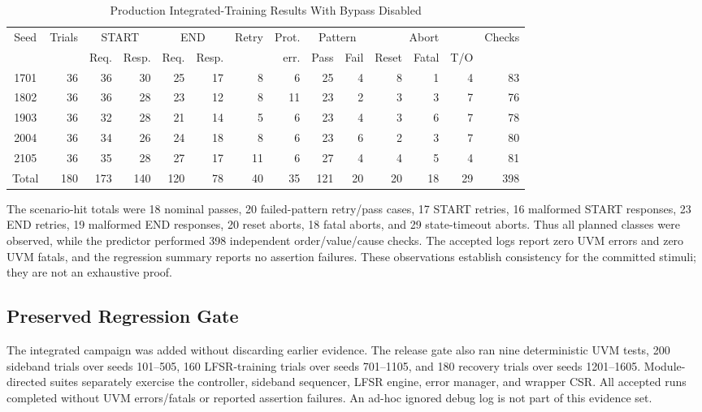 \begin{table}[t]
\caption{Production Integrated-Training Results With Bypass Disabled}
\label{tab:integrated}
\centering
\small
\setlength{\tabcolsep}{4.2pt}
\begin{tabular}{c r rr rr rr rr rrr r}
\toprule
Seed & Trials & \multicolumn{2}{c}{START} & \multicolumn{2}{c}{END} & Retry & Prot. & \multicolumn{2}{c}{Pattern} & \multicolumn{3}{c}{Abort} & Checks \\
 & & Req. & Resp. & Req. & Resp. & & err. & Pass & Fail & Reset & Fatal & T/O & \\
\midrule
1701 & 36 & 36 & 30 & 25 & 17 & 8 & 6  & 25 & 4 & 8 & 1 & 4 & 83 \\
1802 & 36 & 36 & 28 & 23 & 12 & 8 & 11 & 23 & 2 & 3 & 3 & 7 & 76 \\
1903 & 36 & 32 & 28 & 21 & 14 & 5 & 6  & 23 & 4 & 3 & 6 & 7 & 78 \\
2004 & 36 & 34 & 26 & 24 & 18 & 8 & 6  & 23 & 6 & 2 & 3 & 7 & 80 \\
2105 & 36 & 35 & 28 & 27 & 17 & 11& 6  & 27 & 4 & 4 & 5 & 4 & 81 \\
\midrule
Total & 180 & 173 & 140 & 120 & 78 & 40 & 35 & 121 & 20 & 20 & 18 & 29 & 398 \\
\bottomrule
\end{tabular}
\end{table}

The scenario-hit totals were 18 nominal passes, 20 failed-pattern retry/pass
cases, 17 START retries, 16 malformed START responses, 23 END retries, 19
malformed END responses, 20 reset aborts, 18 fatal aborts, and 29 state-timeout
aborts. Thus all planned classes were observed, while the predictor performed
398 independent order/value/cause checks. The accepted logs report zero UVM
errors and zero UVM fatals, and the regression summary reports no assertion
failures. These observations establish consistency for the committed stimuli;
they are not an exhaustive proof.

\subsection{Preserved Regression Gate}

The integrated campaign was added without discarding earlier evidence. The
release gate also ran nine deterministic UVM tests, 200 sideband trials over
seeds 101--505, 160 LFSR-training trials over seeds 701--1105, and 180 recovery
trials over seeds 1201--1605. Module-directed suites separately exercise the
controller, sideband sequencer, LFSR engine, error manager, and wrapper CSR.
All accepted runs completed without UVM errors/fatals or reported assertion
failures. An ad-hoc ignored debug log is not part of this evidence set.


